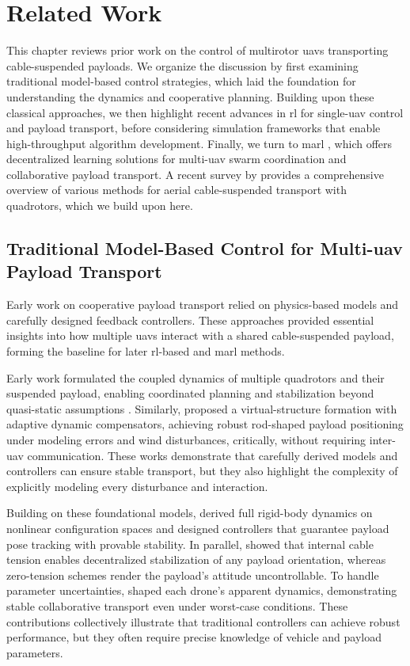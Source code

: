 \chapter{Related Work}
This chapter reviews prior work on the control of multirotor \gls{uav}s transporting cable-suspended payloads. We organize the discussion by first examining traditional model-based control strategies, which laid the foundation for understanding the dynamics and cooperative planning. Building upon these classical approaches, we then highlight recent advances in \gls{rl} for single-\gls{uav} control and payload transport, before considering simulation frameworks that enable high-throughput algorithm development. Finally, we turn to \Gls{marl} \autocite{littman1994markov}, which offers decentralized learning solutions for multi-\gls{uav} swarm coordination and collaborative payload transport. A recent survey by \cite{estevez_review_2024} provides a comprehensive overview of various methods for aerial cable-suspended transport with quadrotors, which we build upon here.

\section{Traditional Model-Based Control for Multi-\gls{uav} Payload Transport}
Early work on cooperative payload transport relied on physics-based models and carefully designed feedback controllers. These approaches provided essential insights into how multiple \gls{uav}s interact with a shared cable-suspended payload, forming the baseline for later \gls{rl}-based and \gls{marl} methods.

Early work formulated the coupled dynamics of multiple quadrotors and their suspended payload, enabling coordinated planning and stabilization beyond quasi-static assumptions \cite{sreenath_dynamics_2013}. Similarly, \cite{villa_cooperative_2021} proposed a virtual-structure formation with adaptive dynamic compensators, achieving robust rod-shaped payload positioning under modeling errors and wind disturbances, critically, without requiring inter-\gls{uav} communication. These works demonstrate that carefully derived models and controllers can ensure stable transport, but they also highlight the complexity of explicitly modeling every disturbance and interaction.

Building on these foundational models, \cite{lee_geometric_2018} derived full rigid-body dynamics on nonlinear configuration spaces and designed controllers that guarantee payload pose tracking with provable stability. In parallel, \cite{tognon_aerial_2018} showed that internal cable tension enables decentralized stabilization of any payload orientation, whereas zero-tension schemes render the payload's attitude uncontrollable. To handle parameter uncertainties, \cite{tagliabue_robust_2017} shaped each drone's apparent dynamics, demonstrating stable collaborative transport even under worst-case conditions. These contributions collectively illustrate that traditional controllers can achieve robust performance, but they often require precise knowledge of vehicle and payload parameters.

